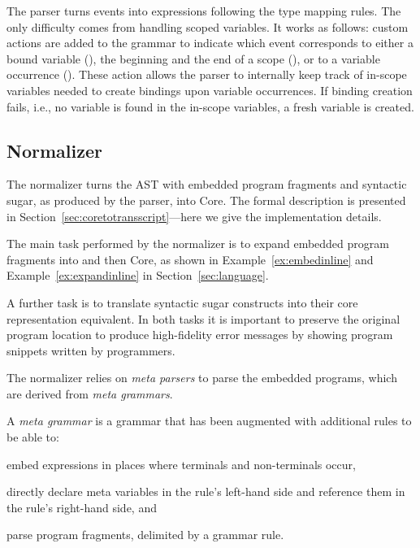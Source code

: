 The parser turns \antlr events into \Tosca expressions following the type mapping rules. The only difficulty
comes from handling scoped variables. It works as follows: custom actions are added to the \antlr grammar to indicate which
event corresponds to either a bound variable (), the beginning and the end of a scope (),
or to a variable occurrence (). These action allows the parser to internally keep track of in-scope variables
needed to create bindings upon variable occurrences. If binding creation fails, i.e., no variable is found in the in-scope variables,
a fresh variable is created. 

\subsection{Normalizer} \label{sec:normalization}

The normalizer turns the AST with embedded program fragments and
syntactic sugar, as produced by the parser, into \Tosca Core.
The formal description is presented in
Section~\ref{sec:coretotransscript}---here we give the implementation
details.

The main task performed by the normalizer is to expand embedded
program fragments into \Tosca and then \Tosca Core, as
shown in Example~\ref{ex:embedinline} and
Example~\ref{ex:expandinline} in Section~\ref{sec:language}.

A further task is to translate syntactic sugar constructs into their
core representation equivalent.  In both tasks it is important to
preserve the original program location to produce high-fidelity error
messages by showing \Tosca program snippets written by
programmers.

The normalizer relies on \emph{meta parsers} to parse the embedded
programs, which are derived from \emph{meta grammars}.
%
\begin{definition} \label{metaGrammar} %
  A \emph{meta grammar} is a grammar that has been augmented with
  additional rules to be able to:
  \begin{enumerate*} [label=\itshape(\roman*)]
  \item embed \Tosca expressions in places where terminals and non-terminals occur,
  \item directly declare meta variables in the rule's left-hand side 
and reference them in the rule's right-hand side, and 
  \item parse program fragments, delimited by a grammar rule.
  \end{enumerate*}
\end{definition}

